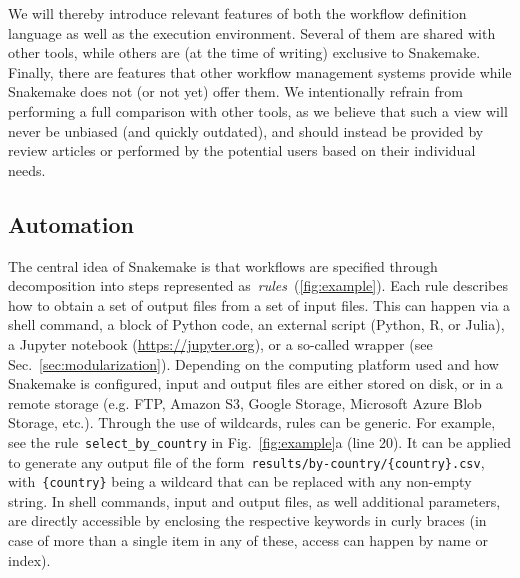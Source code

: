 \documentclass[10pt,a4paper,twocolumn]{article}
\let\plainurl\url
\renewcommand{\url}[1]{\protect\plainurl{#1}}
\begin{document}
We will thereby introduce relevant features of both the workflow definition language as well as the execution environment.
Several of them are shared with other tools, while others are (at the time of writing) exclusive to Snakemake.
Finally, there are features that other workflow management systems provide while Snakemake does not (or not yet) offer them.
We intentionally refrain from performing a full comparison with other tools, as we believe that such a view will never be unbiased (and quickly outdated), and should instead be provided by review articles or performed by the potential users based on their individual needs.

\subsection{Automation}\label{sec:automation}

The central idea of Snakemake is that workflows are specified through decomposition into steps represented as~\emph{rules~}(\autoref{fig:example}).
Each rule describes how to obtain a set of output files from a set of input files.
This can happen via a shell command, a block of Python code, an external script (Python, R, or Julia), a Jupyter notebook (\url{https://jupyter.org}), or a so-called wrapper (see Sec.~\ref{sec:modularization}).
Depending on the computing platform used and how Snakemake is configured, input and output files are either stored on disk, or in a remote storage (e.g. FTP, Amazon S3, Google Storage, Microsoft Azure Blob Storage, etc.).
Through the use of wildcards, rules can be generic.
For example, see the rule~\lstinline!select_by_country! in Fig.~\ref{fig:example}a (line 20).
It can be applied to generate any output file of the form~\lstinline!results/by-country/{country}.csv!, with~\lstinline!{country}! being a wildcard that can be replaced with any non-empty string.
In shell commands, input and output files, as well additional parameters, are directly accessible by enclosing the respective keywords in curly braces (in case of more than a single item in any of these, access can happen by name or index).
\end{document}
